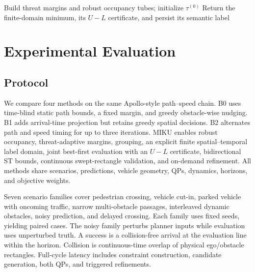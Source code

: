 \begin{algorithm}[t]
\scriptsize
\caption{MIKU Homotopy-Corridor Planning}
\label{alg:miku}
Build threat margins and robust occupancy tubes; initialize $\tau^{(0)}$\;
Return the finite-domain minimum, its $U-L$ certificate, and persist its semantic label\;
\end{algorithm}

\section{Experimental Evaluation}
\label{sec:experiments}

\subsection{Protocol}

We compare four methods on the same Apollo-style path--speed chain. B0 uses time-blind static path bounds, a fixed margin, and greedy obstacle-wise nudging. B1 adds arrival-time projection but retains greedy spatial decisions. B2 alternates path and speed timing for up to three iterations. MIKU enables robust occupancy, threat-adaptive margins, grouping, an explicit finite spatial--temporal label domain, joint best-first evaluation with an $U-L$ certificate, bidirectional ST bounds, continuous swept-rectangle validation, and on-demand refinement. All methods share scenarios, predictions, vehicle geometry, QPs, dynamics, horizons, and objective weights.

Seven scenario families cover pedestrian crossing, vehicle cut-in, parked vehicle with oncoming traffic, narrow multi-obstacle passages, interleaved dynamic obstacles, noisy prediction, and delayed crossing. Each family uses \RandSeedCount{} fixed seeds, yielding \RandCaseCount{} paired cases. The noisy family perturbs planner inputs while evaluation uses unperturbed truth. A success is a collision-free arrival at the evaluation line within the horizon. Collision is continuous-time overlap of physical ego/obstacle rectangles. Full-cycle latency includes constraint construction, candidate generation, both QPs, and triggered refinements.


